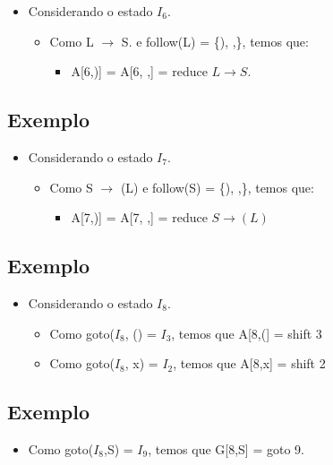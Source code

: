 \documentclass[11pt]{article}
\begin{document}
\begin{itemize}
\item Considerando o estado \(I_6\).
\begin{itemize}
\item Como L \(\to\) S. e follow(L) = \{), ,\}, temos que:
\begin{itemize}
\item A[6,)] = A[6, ,] = reduce \(L \to S\).
\end{itemize}
\end{itemize}
\end{itemize}
\subsection*{Exemplo}
\label{sec:orgead9341}

\begin{itemize}
\item Considerando o estado \(I_7\).
\begin{itemize}
\item Como S \(\to\) (L) e follow(S) = \{), ,\}, temos que:
\begin{itemize}
\item A[7,)] = A[7, ,] = reduce \(S \to (L)\)
\end{itemize}
\end{itemize}
\end{itemize}
\subsection*{Exemplo}
\label{sec:org60b0c29}

\begin{itemize}
\item Considerando o estado \(I_8\).
\begin{itemize}
\item Como goto(\(I_8\), () = \(I_3\), temos que A[8,(] = shift 3
\item Como goto(\(I_8\), x) = \(I_2\), temos que A[8,x] = shift 2
\end{itemize}
\end{itemize}
\subsection*{Exemplo}
\label{sec:org128be5d}

\begin{itemize}
\item Como goto(\(I_8\),S) = \(I_9\), temos que G[8,S] = goto 9.
\end{itemize}
\end{document}
